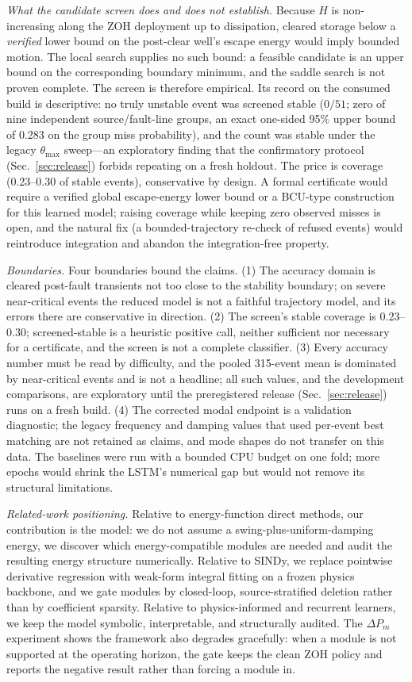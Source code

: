 \documentclass[journal]{IEEEtran}
\begin{document}
\emph{What the candidate screen does and does not establish.} Because $H$ is
non-increasing along the ZOH deployment up to dissipation, cleared storage below
a \emph{verified} lower bound on the post-clear well's escape energy would imply
bounded motion. The local search supplies no such bound: a feasible candidate is
an upper bound on the corresponding boundary minimum, and the saddle search is
not proven complete. The screen is therefore empirical. Its record on the
consumed build is descriptive: no truly unstable event was screened stable
($0/51$; zero of nine independent source/fault-line groups, an exact one-sided
95\% upper bound of 0.283 on the group miss probability), and the count was
stable under the legacy $\theta_{\max}$ sweep---an exploratory finding that the
confirmatory protocol (Sec.~\ref{sec:release}) forbids repeating on a fresh
holdout. The price is coverage (0.23--0.30 of stable events), conservative by
design. A formal certificate would require a verified global escape-energy lower
bound or a BCU-type construction for this learned model; raising coverage while
keeping zero observed misses is open, and the natural fix (a bounded-trajectory
re-check of refused events) would reintroduce integration and abandon the
integration-free property.

\emph{Boundaries.} Four boundaries bound the claims. (1) The accuracy domain is
cleared post-fault transients not too close to the stability boundary; on severe
near-critical events the reduced model is not a faithful trajectory model, and
its errors there are conservative in direction. (2) The screen's stable coverage
is 0.23--0.30; screened-stable is a heuristic positive call, neither sufficient
nor necessary for a certificate, and the screen is not a complete classifier.
(3) Every accuracy number must be read by difficulty, and the pooled 315-event
mean is dominated by near-critical events and is not a headline; all such values,
and the development comparisons, are exploratory until the preregistered release
(Sec.~\ref{sec:release}) runs on a fresh build. (4) The corrected modal endpoint
is a validation diagnostic; the legacy frequency and damping values that used
per-event best matching are not retained as claims, and mode shapes do not
transfer on this data. The baselines were run with a bounded CPU budget on one
fold; more epochs would shrink the LSTM's numerical gap but would not remove its
structural limitations.

\emph{Related-work positioning.} Relative to energy-function direct methods, our
contribution is the model: we do not assume a swing-plus-uniform-damping energy,
we discover which energy-compatible modules are needed and audit the resulting
energy structure numerically. Relative to SINDy, we replace pointwise derivative
regression with weak-form integral fitting on a frozen physics backbone, and we
gate modules by closed-loop, source-stratified deletion rather than by
coefficient sparsity. Relative to physics-informed and recurrent learners, we
keep the model symbolic, interpretable, and structurally audited. The $\Delta
P_m$ experiment shows the framework also degrades gracefully: when a module is
not supported at the operating horizon, the gate keeps the clean ZOH policy and
reports the negative result rather than forcing a module in.
\end{document}
